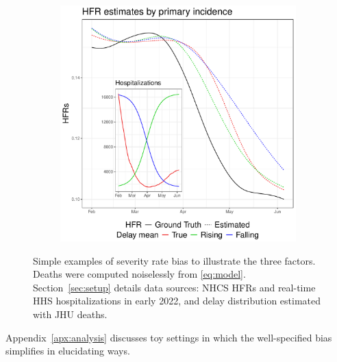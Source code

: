 \documentclass{article}
\renewcommand{\hat}{\widehat} %
\DeclareMathOperator{\bias}{Bias}
\begin{document}
\begin{figure}
\begin{subfigure}[b]{0.32\linewidth}
         \caption{}
         \label{fig:toy_delay}
     \end{subfigure}
     \begin{subfigure}[b]{0.32\linewidth}
         \centering
         \includegraphics[width=\linewidth]{Figures/Simulated/toy_chging_primary.pdf}
         \caption{}
         \label{fig:toy_primary}
     \end{subfigure}
        \caption{Simple examples of severity rate bias to illustrate the three
        factors. Deaths were computed noiselessly from \eqref{eq:model}.
        Section~\ref{sec:setup} details data sources: 
        NHCS HFRs and real-time HHS hospitalizations in early 2022,
        and delay distribution estimated with JHU deaths.}
        \label{fig:bias_ex_main}
\end{figure}



Appendix~\ref{apx:analysis} discusses toy settings in which the well-specified bias simplifies in elucidating ways.
\end{document}
